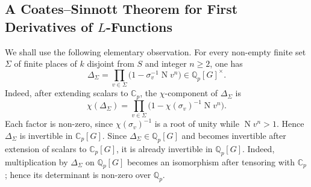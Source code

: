 \documentclass[a4paper,11pt]{article}
\begin{document}
\subsection{A Coates--Sinnott Theorem for First Derivatives of \(L\)-Functions}\label{Coates_Sinnott_Section}
We shall use the following elementary observation. For every non-empty finite
set \(\Sigma\) of finite places of \(k\) disjoint from \(S\) and integer \(n\geq 2\), one has
\[
\Delta_\Sigma
=
\prod_{v\in\Sigma}
\bigl(1-\sigma_v^{-1}\operatorname Nv^n\bigr)
\in
\mathbb Q_p[G]^\times.
\]
Indeed, after extending scalars to \(\mathbb C_p\), the \(\chi\)-component of
\(\Delta_\Sigma\) is
\[
\chi(\Delta_\Sigma)
=
\prod_{v\in\Sigma}
\bigl(1-\chi(\sigma_v)^{-1}\operatorname Nv^n\bigr).
\]
Each factor is non-zero, since \(\chi(\sigma_v)^{-1}\) is a root of unity while
\(\operatorname Nv^n>1\). Hence \(\Delta_\Sigma\) is invertible in
\(\mathbb C_p[G]\). Since \(\Delta_\Sigma\in\mathbb Q_p[G]\) and becomes invertible after extension
of scalars to \(\mathbb C_p[G]\), it is already invertible in
\(\mathbb Q_p[G]\). Indeed, multiplication by \(\Delta_\Sigma\) on
\(\mathbb Q_p[G]\) becomes an isomorphism after tensoring with \(\mathbb C_p\);
hence its determinant is non-zero over \(\mathbb Q_p\).
\end{document}
